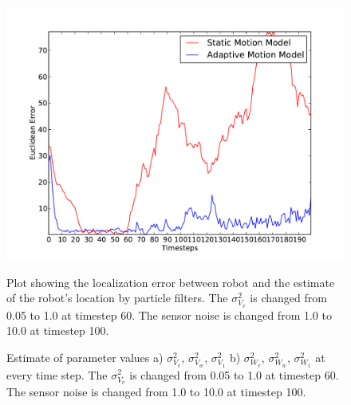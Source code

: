 \documentclass[12pt]{dalcsthesis}
\begin{document}
\begin{figure}[!ht]
  \centering
     {\includegraphics[height = 3.0 in]{./plots/200_005_05_s_10_100_100_traj_3_trial_1.pdf}}
  \caption{\label{fig-different sensor noise} Plot showing the localization error between robot and the estimate of the robot's location by particle filters. The $\sigma_{V_{v}}^{2}$ is changed from 0.05 to 1.0 at timestep 60. The sensor noise is changed from 1.0 to 10.0 at timestep 100. }
\end{figure}

\begin{figure}[!ht]
  \centering
  \caption{\label{fig-different sensor noise motion model trans} Estimate of parameter values a) $\sigma_{V_{v}}^{2}$, $\sigma_{V_{w}}^{2}$,  $\sigma_{V_{1}}^{2}$ b) $\sigma_{W_{v}}^{2}$, $\sigma_{W_{w}}^{2}$, $\sigma_{W_{1}}^{2}$ at every time step. The $\sigma_{V_{v}}^{2}$ is changed from 0.05 to 1.0 at timestep 60. The sensor noise is changed from 1.0 to 10.0 at timestep 100.}
\end{figure}
\end{document}
